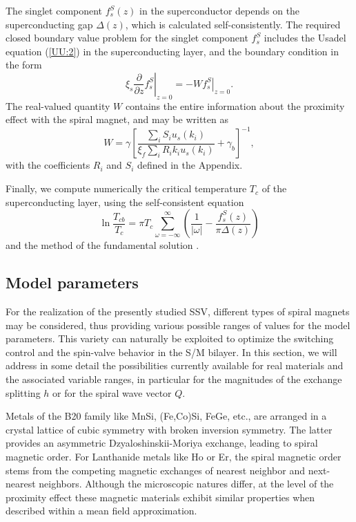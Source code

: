 \documentclass[prb,amsmath,amssymb,reprint]{revtex4-2}
\begin{document}
The singlet component $f_{s}^{S}(z)$ in the superconductor depends on the superconducting gap $\Delta(z)$, which is calculated self-consistently. The required closed boundary value problem for the singlet component $f_{s}^{S}$ includes the Usadel
equation (\ref{UU:2}) in the superconducting layer, and the boundary condition in the form
\begin{equation}
\left. \xi _{s}\frac{\partial }{\partial z}f_{s}^{S}\right\vert
_{z=0}=-\left. Wf_{s}^{S}\right\vert _{z=0}.  \label{BCW}
\end{equation}
The real-valued quantity $W$ contains the entire information about the proximity
effect with the spiral magnet, and may be written as
\begin{equation}
W=\gamma  \left[\frac{\sum\limits_{i}S_{i}u_{s}(k_{i})}{\xi
_{f}\sum \limits_{i}R_{i} k_i u_{s}(k_{i})}+\gamma _{b} \right]^{-1}, \label{W}
\end{equation}
with the coefficients $R_i$ and $S_i$ defined  in the Appendix.

Finally, we compute numerically the critical temperature $T_c$ of the superconducting layer,  using the self-consistent equation
\begin{equation}
\ln \frac{T_{cb}}{T_{c}}=\pi T_{c}\sum_{\omega =-\infty }^{\infty } \left(%
\frac{1}{ \left\vert \omega \right\vert} -\frac{f_{s}^{S}(z)}{\pi \Delta(z)}
\right)  \label{SelfCons}
\end{equation}
and the method of the fundamental solution \cite%
{Fominov2002,Champel2005,Lofwander07}.

\subsection{Model parameters}

For the realization of the presently studied SSV, different types of spiral magnets may be considered, thus providing various possible ranges of values for the model parameters. This variety can naturally be exploited to optimize the switching control and the spin-valve behavior in the S/M bilayer. In this section, we will address in some detail the possibilities currently  available for real materials and the associated variable ranges, in particular for the magnitudes of the exchange splitting $h$ or for the spiral wave vector $Q$.

Metals of the B20 family like MnSi, (Fe,Co)Si, FeGe, etc., are arranged in a crystal
lattice of cubic symmetry with broken inversion symmetry. The latter provides an asymmetric Dzyaloshinskii-Moriya  exchange, leading to  spiral magnetic order. For Lanthanide metals like Ho or Er, the spiral magnetic order stems from the competing magnetic exchanges of nearest neighbor and next-nearest neighbors. Although the microscopic natures differ, at the level of the proximity effect these magnetic materials exhibit similar properties when described within a mean field approximation.
\end{document}
